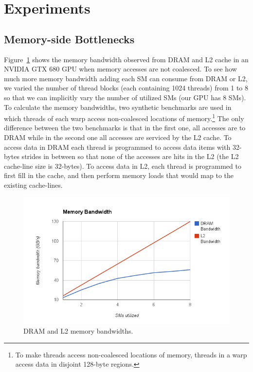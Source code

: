 \section{Experiments}

\subsection{Memory-side Bottlenecks}

Figure~\ref{fig:l2drambandwidth} shows the memory bandwidth observed from DRAM and L2 cache in an
NVIDIA GTX 680 GPU when memory accesses are not coalesced. To see how much more memory bandwidth
adding each SM can consume from DRAM or L2, we varied the number of thread blocks (each containing
1024 threads) from 1 to 8 so that we can implicitly vary the number of utilized SMs (our GPU has 8
SMs). To calculate the memory bandwidths, two synthetic benchmarks are used in which threads of each
warp access non-coalesced locations of memory.\footnote{To make threads access non-coalesced
locations of memory, threads in a warp access data in disjoint 128-byte regions.} The only
difference between the two benchmarks is that in the first one, all accesses are to DRAM while in
the second one all accesses are serviced by the L2 cache. To access data in DRAM each thread is
programmed to access data items with 32-bytes strides in between so that none of the accesses are
hits in the L2 (the L2 cache-line size is 32-bytes). To access data in L2, each thread is
programmed to first fill in the cache, and then perform memory loads that would map to the existing
cache-lines.

\begin{figure}[t]
\includegraphics[scale=0.35]{DRAML2bandwidth.png}
\caption{DRAM and L2 memory bandwidths.}
\label{fig:l2drambandwidth}
\end{figure}


